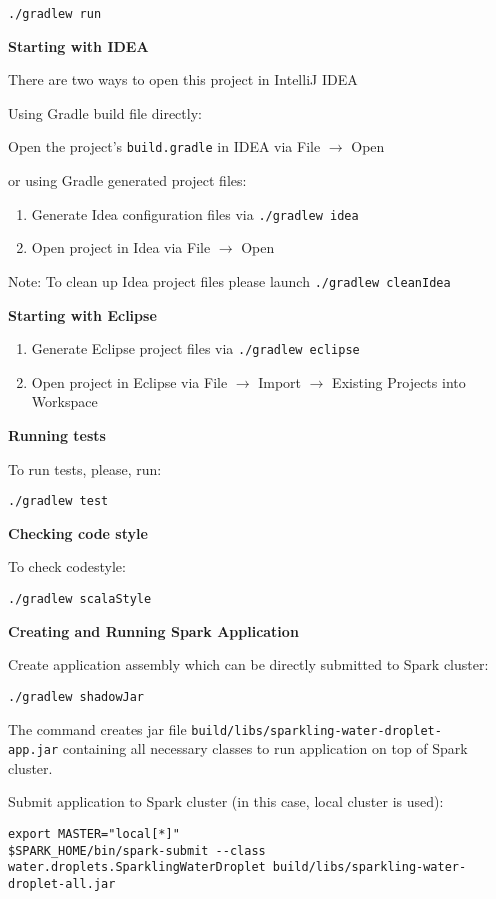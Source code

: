\begin{lstlisting}[style=Bash]
./gradlew run
\end{lstlisting}

\textbf{Starting with IDEA}

There are two ways to open this project in IntelliJ IDEA

Using Gradle build file directly:

\quad Open the project's \texttt{build.gradle} in IDEA via File $\rightarrow$ Open

or using Gradle generated project files:

\begin{enumerate}
\item Generate Idea configuration files via  {\lstinline[style=Bash]|./gradlew idea|} 
\item Open project in Idea via File $\rightarrow$ Open
\end{enumerate}

Note: To clean up Idea project files please launch {\lstinline[style=Bash]|./gradlew cleanIdea|} 

\textbf{Starting with Eclipse}

\begin{enumerate}
\item Generate Eclipse project files via {\lstinline[style=Bash]|./gradlew eclipse|} 
\item Open project in Eclipse via File $\rightarrow$ Import $\rightarrow$ Existing Projects into Workspace
\end{enumerate}

\textbf{Running tests}

To run tests, please, run:

\begin{lstlisting}[style=Bash]
./gradlew test
\end{lstlisting}

\textbf{Checking code style}

To check codestyle:

\begin{lstlisting}[style=Bash]
./gradlew scalaStyle
\end{lstlisting}

\textbf{Creating and Running Spark Application}

Create application assembly which can be directly submitted to Spark cluster:

\begin{lstlisting}[style=Bash]
./gradlew shadowJar
\end{lstlisting}

The command creates jar file \texttt{build/libs/sparkling-water-droplet-}\\
\texttt{app.jar} containing all necessary classes to run application on top of Spark cluster.

Submit application to Spark cluster (in this case, local cluster is used):

\begin{lstlisting}[style=Bash]
export MASTER="local[*]"
$SPARK_HOME/bin/spark-submit --class water.droplets.SparklingWaterDroplet build/libs/sparkling-water-droplet-all.jar
\end{lstlisting}


